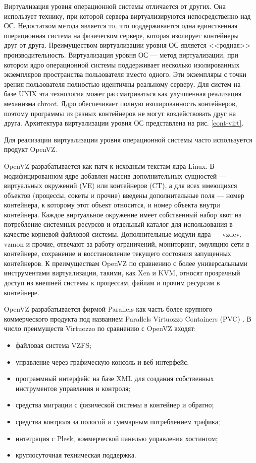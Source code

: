 Виртуализация уровня операционной системы отличается от других.
Она использует технику, при которой сервера виртуализируются непосредственно над ОС.
Недостатком метода является то, что поддерживается одна единственная операционная система на физическом сервере, которая изолирует контейнеры друг от друга.
Преимуществом виртуализации уровня ОС является <<родная>> производительность.
Виртуализация уровня ОС --- метод виртуализации, при котором ядро операционной системы поддерживает несколько изолированных экземпляров пространства пользователя вместо одного.
Эти экземпляры с точки зрения пользователя полностью идентичны реальному серверу.
Для систем на базе UNIX эта технология может рассматриваться как улучшенная реализация механизма chroot.
Ядро обеспечивает полную изолированность контейнеров, поэтому программы из разных контейнеров не могут воздействовать друг на друга.
Архитектура виртуализации уровня ОС представлена на рис. \ref{cont-virt}.

Для реализации виртуализации уровня операционной системы часто используется продукт OpenVZ.

OpenVZ разрабатывается как патч к исходным текстам ядра Linux.
В модифицированном ядре добавлен массив дополнительных сущностей --- виртуальных окружений (VE) или контейнеров (CT), а для всех имеющихся объектов (процессы, сокеты и прочие) введены дополнительные поля --- номер контейнера, к которому этот объект относится, и номер объекта внутри контейнера.
Каждое виртуальное окружение имеет собственный набор квот на потребление системных ресурсов и отдельный каталог для использования в качестве корневой файловой системы.
Дополнительные модули ядра --- vzdev, vzmon и прочие, отвечают за работу ограничений, мониторинг, эмуляцию сети в контейнере, сохранение и восстановление текущего состояния запущенных контейнеров.
К преимуществам OpenVZ по сравнению с более универсальными инструментами виртуализации, такими, как Xen и KVM, относят прозрачный доступ из внешней системы к процессам, файлам и прочим ресурсам в контейнере.

OpenVZ разрабатывается фирмой Parallels как часть более крупного коммерческого продукта под названием Parallels Virtuozzo Containers (PVC) \cite{lxc-openvz}.
В число преимуществ Virtuozzo по сравнению с OpenVZ входят:
\begin{itemize}
  \item файловая система VZFS;
  \item управление через графическую консоль и веб-интерфейс;
  \item программный интерфейс на базе XML для создания собственных инструментов управления и контроля;
  \item средства миграции с физической системы в контейнер и обратно;
  \item средства контроля за полосой и суммарным потреблением трафика;
  \item интеграция с Plesk, коммерческой панелью управления хостингом;
  \item круглосуточная техническая поддержка.
\end{itemize}

